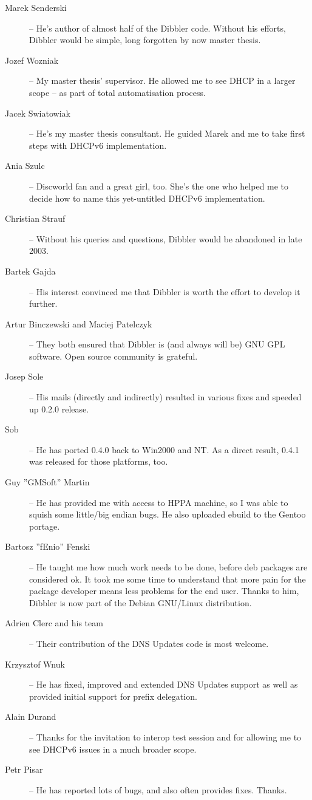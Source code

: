 \begin{description}
\item[Marek Senderski] -- He's author of almost half of the Dibbler
  code. Without his efforts, Dibbler would be simple, long forgotten
  by now master thesis.
\item[Jozef Wozniak] -- My master thesis' supervisor. He allowed me to
  see DHCP in a larger scope -- as part of total automatisation process.
\item[Jacek Swiatowiak] -- He's my master thesis consultant. He guided 
  Marek and me to take first steps with DHCPv6 implementation.
\item[Ania Szulc] -- Discworld fan and a great girl, too. She's the one
  who helped me to decide how to name this yet-untitled DHCPv6 implementation.
\item[Christian Strauf] -- Without his queries and questions, Dibbler
  would be abandoned in late 2003.
\item[Bartek Gajda] -- His interest convinced me that Dibbler is worth
  the effort to develop it further.
\item[Artur Binczewski and Maciej Patelczyk] -- They both ensured that
  Dibbler is (and always will be) GNU GPL software. Open source
  community is grateful.
\item[Josep Sole] -- His mails (directly and indirectly) resulted in
  various fixes and speeded up 0.2.0 release.
\item[Sob] -- He has ported 0.4.0 back to Win2000 and NT. As a direct
  result, 0.4.1 was released for those platforms, too.
\item[Guy ''GMSoft'' Martin] -- He has provided me with access to HPPA machine,
  so I was able to squish some little/big endian bugs. He also uploaded
  ebuild to the Gentoo portage.
\item[Bartosz ''fEnio'' Fenski] -- He taught me how much work needs to be done,
  before deb packages are considered ok. It took me some time to understand that 
  more pain for the package developer means less problems for the end user. 
  Thanks to him, Dibbler is now part of the Debian GNU/Linux distribution.
\item[Adrien Clerc and his team] -- Their contribution of the DNS
  Updates code is most welcome.
\item[Krzysztof Wnuk] -- He has fixed, improved and extended DNS
  Updates support as well as provided initial support for prefix
  delegation.
\item[Alain Durand] -- Thanks for the invitation to interop test
  session and for allowing me to see DHCPv6 issues in a much broader
  scope.
\item[Petr Pisar] -- He has reported lots of bugs, and also often provides fixes. 
  Thanks.
\end{description}
